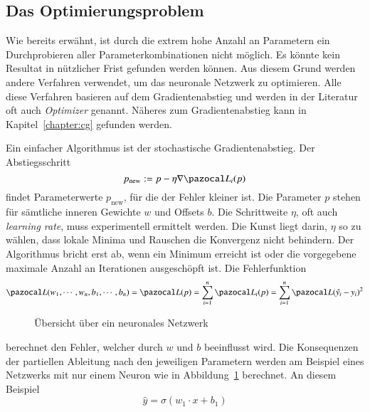 \subsection{Das Optimierungsproblem}
Wie bereits erwähnt, ist durch die extrem hohe Anzahl an Parametern ein Durchprobieren aller Parameterkombinationen nicht möglich.
Es könnte kein Resultat in nützlicher Frist gefunden werden können.
Aus diesem Grund werden andere Verfahren verwendet, um das neuronale
Netzwerk zu optimieren.
Alle diese Verfahren basieren auf dem Gradientenabstieg und werden
in der Literatur oft auch {\em Optimizer} genannt.
%
%
Näheres zum Gradientenabstieg kann in Kapitel~\ref{chapter:cg} gefunden werden.

Ein einfacher Algorithmus ist der stochastische Gradientenabstieg.
%
Der Abstiegsschritt 
\begin{equation}
p_{\text{new}}:=p-\eta \nabla \Lb_{i}(p)
\end{equation}
findet Parameterwerte $p_{\text{new}}$, für die der Fehler kleiner ist.
Die Parameter $p$ stehen für sämtliche inneren Gewichte $w$ und Offsets $b$.
Die Schrittweite $\eta$, oft auch {\em learning rate}, muss experimentell ermittelt werden.
%
Die Kunst liegt darin, $\eta$ so zu wählen, dass lokale Minima und Rauschen die Konvergenz nicht behindern.
Der Algorithmus bricht erst ab, wenn ein Minimum erreicht ist oder die vorgegebene maximale Anzahl an Iterationen ausgeschöpft ist.
Die Fehlerfunktion
\begin{equation}
\Lb(w_1, \cdots, w_n, b_1, \cdots, b_n)
=
\Lb(p)
=
\sum_{i=1}^{n}\Lb_{i}(p)
=
\sum_{i=1}^{n}\Lb(\hat{y_i}-y_i)^2
\end{equation}
\begin{figure}
	\begin{center}
		
		\caption{Übersicht über ein neuronales Netzwerk}
		\label{ableitung:fig:single_neuron}
	\end{center}
\end{figure}%
berechnet den Fehler, welcher durch $w$ und $b$ beeinflusst wird.
Die Konsequenzen der partiellen Ableitung nach den jeweiligen
Parametern werden am Beispiel eines Netzwerks mit nur einem Neuron
wie in Abbildung~\ref{ableitung:fig:single_neuron} berechnet.
An diesem Beispiel
\begin{equation}
\hat{y} = \sigma \left( w_1 \cdot x + b_1 \right)
\end{equation}
